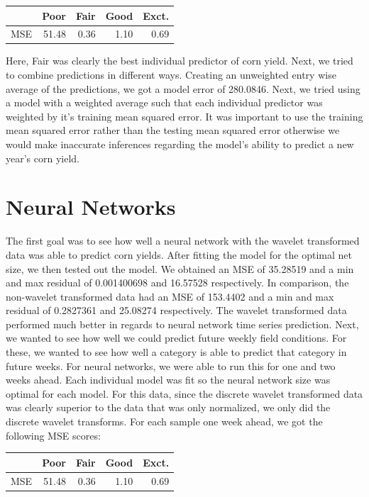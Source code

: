 \documentclass[a4paper]{apa6}
\begin{document}
\begin{center}
\begin{tabular}{|r|r|r|r|r|}
  \hline
&  Poor & Fair & Good & Exct. \\
\hline
MSE & 51.48 & 0.36 & 1.10 & 0.69 \\
  \hline
\end{tabular}
\end{center}



Here, Fair was clearly the best individual predictor of corn yield. Next, we tried to combine predictions in different ways. Creating an unweighted entry wise average of the predictions, we got a model error of 280.0846. Next, we tried using a model with a weighted average such that each individual predictor was weighted by it’s training mean squared error. It was important to use the training mean squared error rather than the testing mean squared error otherwise we would make inaccurate inferences regarding the model’s ability to predict a new year’s corn yield. 

\section*{Neural Networks}
The first goal was to see how well a neural network with the wavelet transformed data was able to predict corn yields. After fitting the model for the optimal net size, we then tested out the model. We obtained an MSE of 35.28519 and a min and max residual of 0.001400698 and 16.57528 respectively. In comparison, the non-wavelet transformed data had an MSE of 153.4402 and a min and max residual of 0.2827361 and 25.08274 respectively. The wavelet transformed data performed much better in regards to neural network time series prediction. 
Next, we wanted to see how well we could predict future weekly field conditions. For these, we wanted to see how well a category is able to predict that category in future weeks. For neural networks, we were able to run this for one and two weeks ahead. Each individual model was fit so the neural network size was optimal for each model.  For this data, since the discrete wavelet transformed data was clearly superior to the data that was only normalized, we only did the discrete wavelet transforms. For each sample one week ahead, we got the following MSE scores:

\begin{center}
\begin{tabular}{|r|r|r|r|r|}
  \hline
&  Poor & Fair & Good & Exct. \\
\hline
MSE & 51.48 & 0.36 & 1.10 & 0.69 \\
  \hline
\end{tabular}
\end{center}
\end{document}
